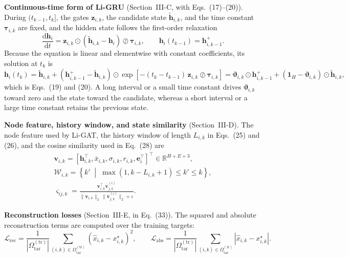 \documentclass[10pt,a4paper]{article}
\begin{document}
\textbf{Continuous-time form of Li-GRU} (Section~III-C, with Eqs.~(17)--(20)). During $(t_{k-1},t_k]$, the gates $\mathbf z_{i,k}$, the candidate state $\tilde{\mathbf h}_{i,k}$, and the time constant $\boldsymbol\tau_{i,k}$ are fixed, and the hidden state follows the first-order relaxation
\begin{equation}
\frac{\mathrm d\mathbf h_i}{\mathrm dt}=\mathbf z_{i,k}\odot\left(\tilde{\mathbf h}_{i,k}-\mathbf h_i\right)\oslash\boldsymbol\tau_{i,k},\qquad \mathbf h_i(t_{k-1})=\mathbf h^{+}_{i,k-1}.
\end{equation}
Because the equation is linear and elementwise with constant coefficients, its solution at $t_k$ is
\begin{equation}
\mathbf h_i(t_k)=\tilde{\mathbf h}_{i,k}+\left(\mathbf h^{+}_{i,k-1}-\tilde{\mathbf h}_{i,k}\right)\odot\exp\!\left[-(t_k-t_{k-1})\,\mathbf z_{i,k}\oslash\boldsymbol\tau_{i,k}\right]
=\boldsymbol\vartheta_{i,k}\odot\mathbf h^{+}_{i,k-1}+\left(\mathbf 1_H-\boldsymbol\vartheta_{i,k}\right)\odot\tilde{\mathbf h}_{i,k},
\end{equation}
which is Eqs.~(19) and (20). A long interval or a small time constant drives $\boldsymbol\vartheta_{i,k}$ toward zero and the state toward the candidate, whereas a short interval or a large time constant retains the previous state.

\textbf{Node feature, history window, and state similarity} (Section~III-D). The node feature used by Li-GAT, the history window of length $L_{i,k}$ in Eqs.~(25) and (26), and the cosine similarity used in Eq.~(28) are
\begin{gather}
\mathbf v_{i,k}=\left[\mathbf h_{i,k}^{\top},\bar x_{i,k},\sigma_{i,k},r_{i,k},\mathbf e_i^{\top}\right]^{\top}\in\mathbb R^{H+E+3},\\
\mathcal W_{i,k}=\left\{k'\;\middle|\;\max(1,k-L_{i,k}+1)\le k'\le k\right\},\\
\varsigma_{ij,k}=\frac{\mathbf v_{i,k}^{\top}\bar{\mathbf v}^{(i)}_{j,k}}{\|\mathbf v_{i,k}\|_2\,\|\bar{\mathbf v}^{(i)}_{j,k}\|_2+\varepsilon}.
\end{gather}

\textbf{Reconstruction losses} (Section~III-E, in Eq.~(33)). The squared and absolute reconstruction terms are computed over the training targets:
\begin{equation}
\mathcal L_{\mathrm{rec}}=\frac{1}{|\Omega^{(\mathrm{tr})}_{\mathrm{tar}}|}\sum_{(i,k)\in\Omega^{(\mathrm{tr})}_{\mathrm{tar}}}\left(\hat x_{i,k}-x^{\star}_{i,k}\right)^2,\qquad
\mathcal L_{\mathrm{abs}}=\frac{1}{|\Omega^{(\mathrm{tr})}_{\mathrm{tar}}|}\sum_{(i,k)\in\Omega^{(\mathrm{tr})}_{\mathrm{tar}}}\left|\hat x_{i,k}-x^{\star}_{i,k}\right|.
\end{equation}
\end{document}
